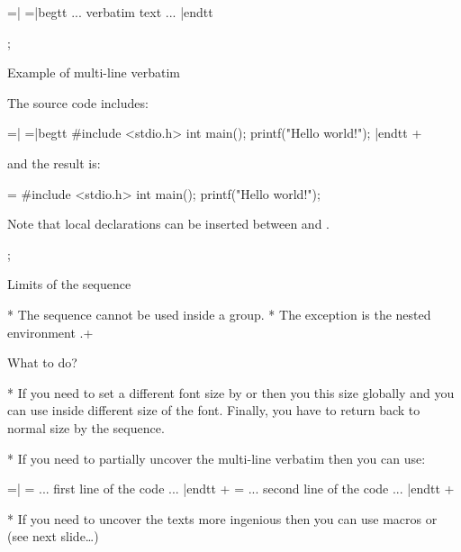 \pg=\adef|{\bslash}\begtt
\pg=|begtt
... verbatim text ...
|endtt
\endtt

\pg; %

\sec Example of multi-line verbatim

The source code includes:\smallskip

\pg=\adef|{\bslash}\begtt
\pg=\Red\typosize[13/15]|begtt
#include <stdio.h>
int main();
{
  printf("Hello world!\n");
}
|endtt
\endtt\pg+

and the result is:\smallskip

\pg=\Red\typosize[13/15]\begtt
#include <stdio.h>
int main();
{
  printf("Hello world!\n");
}
\endtt

Note that local declarations can be inserted between \code{\\pg=} and
\code{\\begtt}.

\pg; %

\sec Limits of the \code{\\pg+} sequence

* The \code{\\pg+} sequence cannot be used inside a group.
* The exception is the nested environment .\pg+

\secc What to do?

* If you need to set a different font size by \code{\\typosize} or
  \code{\\typoscale} then you this size globally and you can use
  \code{\\pg+} inside different size of the font. Finally, you have to
  return back to normal size by the \code{\\normalsize} sequence.
 
* If you need to partially uncover the multi-line verbatim then you
   can use:

\pg=\typosize[13/15]\adef|{\bslash}\begtt
\pg=\begtt
... first line of the code ...
|endtt \pg+ \pg=\begtt
... second line of the code ...
|endtt \pg+
\endtt

* If you need to uncover the texts more ingenious then you can
  use macros \code{\\use} or \code{\\pshow} (see next slide\dots)

